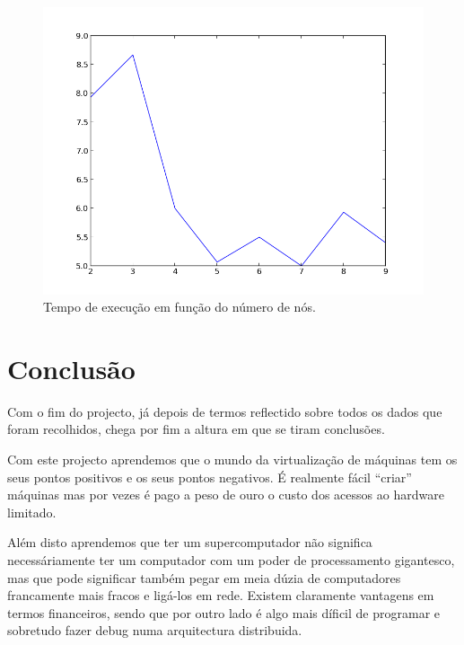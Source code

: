 \documentclass[a4paper]{article}
\begin{document}
\begin{figure}[h]
	\includegraphics[keepaspectratio=true, width=0.6\textheight]{imgs/scalability.png}
	\caption{Tempo de execução em função do número de nós.}
\end{figure}
\clearpage


\section{Conclusão}
\indent \indent Com o fim do projecto, já depois de termos reflectido sobre todos os dados que foram recolhidos, chega por fim a altura em que se tiram conclusões.

Com este projecto aprendemos que o mundo da virtualização de máquinas tem os seus pontos positivos e os seus pontos negativos. É realmente fácil ``criar'' máquinas mas por vezes é pago a peso de ouro o custo dos acessos ao hardware limitado.

Além disto aprendemos que ter um supercomputador não significa necessáriamente ter um computador com um poder de processamento gigantesco, mas que pode significar também pegar em meia dúzia de computadores francamente mais fracos e ligá-los em rede. Existem claramente vantagens em termos financeiros, sendo que por outro lado é algo mais díficil de programar e sobretudo fazer debug numa arquitectura distribuida.
\clearpage
\end{document}
